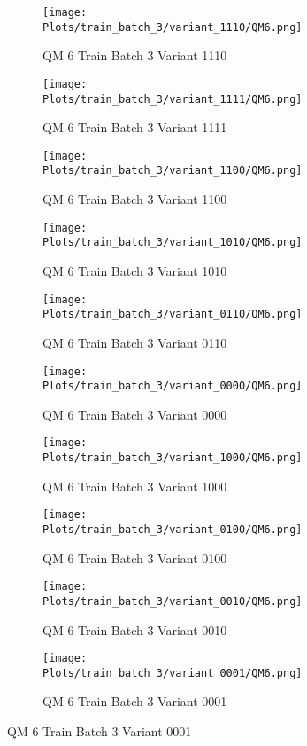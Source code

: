\documentclass{DissertateFigs}
\begin{document}
\begin{figure}[t!]
    \begin{subfigure}{0.47\textwidth}
    \texttt{[image: Plots/train\_batch\_3/variant\_1110/QM6.png]}
    \caption{QM 6 Train Batch 3 Variant 1110}
    \end{subfigure}
    \begin{subfigure}{0.47\textwidth}
    \texttt{[image: Plots/train\_batch\_3/variant\_1111/QM6.png]}
    \caption{QM 6 Train Batch 3 Variant 1111}
    \end{subfigure}

\medskip

    \begin{subfigure}{0.47\textwidth}
    \texttt{[image: Plots/train\_batch\_3/variant\_1100/QM6.png]}
    \caption{QM 6 Train Batch 3 Variant 1100}
    \end{subfigure}
    \begin{subfigure}{0.47\textwidth}
    \texttt{[image: Plots/train\_batch\_3/variant\_1010/QM6.png]}
    \caption{QM 6 Train Batch 3 Variant 1010}
    \end{subfigure}

\medskip

    \begin{subfigure}{0.47\textwidth}
    \texttt{[image: Plots/train\_batch\_3/variant\_0110/QM6.png]}
    \caption{QM 6 Train Batch 3 Variant 0110}
    \end{subfigure}
    \begin{subfigure}{0.47\textwidth}
    \texttt{[image: Plots/train\_batch\_3/variant\_0000/QM6.png]}
    \caption{QM 6 Train Batch 3 Variant 0000}
    \end{subfigure}

\medskip

    \begin{subfigure}{0.47\textwidth}
    \texttt{[image: Plots/train\_batch\_3/variant\_1000/QM6.png]}
    \caption{QM 6 Train Batch 3 Variant 1000}
    \end{subfigure}
    \begin{subfigure}{0.47\textwidth}
    \texttt{[image: Plots/train\_batch\_3/variant\_0100/QM6.png]}
    \caption{QM 6 Train Batch 3 Variant 0100}
    \end{subfigure}

\medskip

    \begin{subfigure}{0.47\textwidth}
    \texttt{[image: Plots/train\_batch\_3/variant\_0010/QM6.png]}
    \caption{QM 6 Train Batch 3 Variant 0010}
    \end{subfigure}
    \begin{subfigure}{0.47\textwidth}
    \texttt{[image: Plots/train\_batch\_3/variant\_0001/QM6.png]}
    \caption{QM 6 Train Batch 3 Variant 0001}
    \end{subfigure}


\end{figure}
\end{document}
